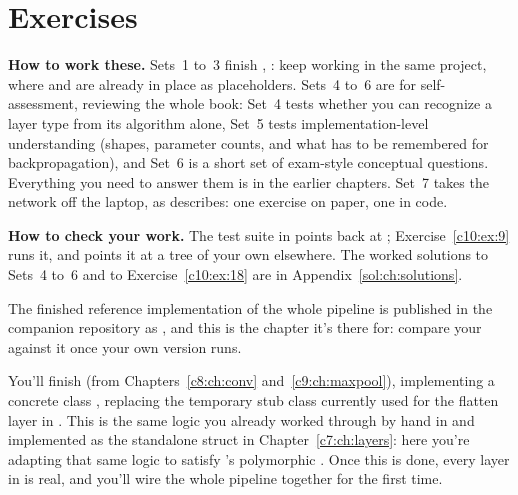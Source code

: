 
\section{Exercises}
\label{c10:sec:exercises}

\begin{aside}
\textbf{How to work these.} Sets~1 to~3 finish , : keep
working in the same project, where  and  are already in place as
placeholders. Sets~4 to~6 are for self-assessment, reviewing the whole book: Set~4 tests whether you
can recognize a layer type from its algorithm alone, Set~5 tests implementation-level
understanding (shapes, parameter counts, and what has to be remembered for backpropagation), and
Set~6 is a short set of exam-style conceptual questions. Everything you need to answer them is in
the earlier chapters. Set~7 takes the network off the laptop, as 
describes: one exercise on paper, one in code.

\textbf{How to check your work.} The test suite in 
points back at ; Exercise~\ref{c10:ex:9} runs it, and 
points it at a tree of your own elsewhere. The worked solutions to Sets~4 to~6 and to
Exercise~\ref{c10:ex:18} are in Appendix~\ref{sol:ch:solutions}.

The finished reference implementation of the whole pipeline is published in the companion
repository as , and this is the chapter it's there for: compare your
 against it once your own version runs.
\end{aside}

\label{c10:set:1}\label{c10:app:a}
You'll finish  (from Chapters~\ref{c8:ch:conv} and~\ref{c9:ch:maxpool}),
implementing a concrete class , replacing the temporary stub class
 currently used for the flatten layer in . This is
the same logic you already worked through by hand in  and implemented as
the standalone struct  in Chapter~\ref{c7:ch:layers}: here you're adapting
that same logic to satisfy 's polymorphic . Once this
is done, every layer in  is real, and you'll wire the whole pipeline together for
the first time.

